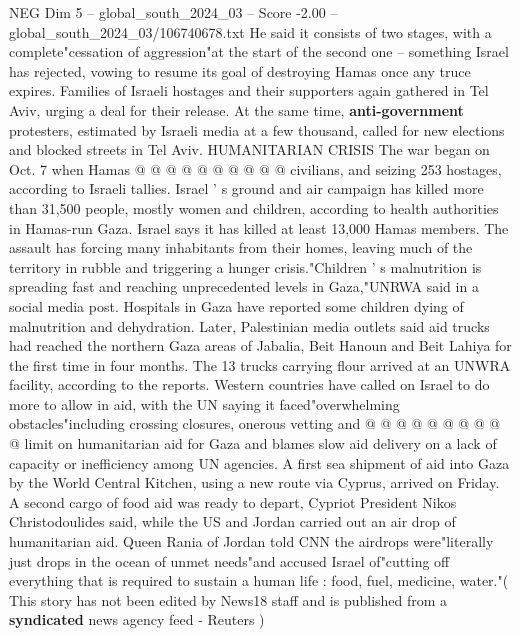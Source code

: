 \begin{textsample}{NEG Dim 5 – global\_south\_2024\_03 – Score -2.00 – global\_south\_2024\_03/106740678.txt}
He said it consists of two stages, with a complete"cessation of aggression"at the start of the second one -- something Israel has rejected, vowing to resume its goal of destroying Hamas once any truce expires.
Families of Israeli hostages and their supporters again gathered in Tel Aviv, urging a deal for their release.
At the same time, \textbf{anti-government} protesters, estimated by Israeli media at a few thousand, called for new elections and blocked streets in Tel Aviv.
HUMANITARIAN CRISIS The war began on Oct. 7 when Hamas @ @ @ @ @ @ @ @ @ @ civilians, and seizing 253 hostages, according to Israeli tallies.
Israel ' s ground and air campaign has killed more than 31,500 people, mostly women and children, according to health authorities in Hamas-run Gaza.
Israel says it has killed at least 13,000 Hamas members.
The assault has forcing many inhabitants from their homes, leaving much of the territory in rubble and triggering a hunger crisis."Children ' s malnutrition is spreading fast and reaching unprecedented levels in Gaza,"UNRWA said in a social media post.
Hospitals in Gaza have reported some children dying of malnutrition and dehydration.
Later, Palestinian media outlets said aid trucks had reached the northern Gaza areas of Jabalia, Beit Hanoun and Beit Lahiya for the first time in four months.
The 13 trucks carrying flour arrived at an UNWRA facility, according to the reports.
Western countries have called on Israel to do more to allow in aid, with the UN saying it faced"overwhelming obstacles"including crossing closures, onerous vetting and @ @ @ @ @ @ @ @ @ @ limit on humanitarian aid for Gaza and blames slow aid delivery on a lack of capacity or inefficiency among UN agencies.
A first sea shipment of aid into Gaza by the World Central Kitchen, using a new route via Cyprus, arrived on Friday.
A second cargo of food aid was ready to depart, Cypriot President Nikos Christodoulides said, while the US and Jordan carried out an air drop of humanitarian aid.
Queen Rania of Jordan told CNN the airdrops were"literally just drops in the ocean of unmet needs"and accused Israel of"cutting off everything that is required to sustain a human life : food, fuel, medicine, water."( This story has not been edited by News18 staff and is published from a \textbf{syndicated} news agency feed - Reuters )

\end{textsample}
